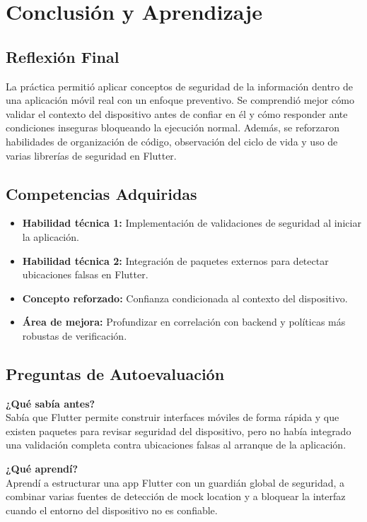 \documentclass[12pt, a4paper]{article}
\begin{document}
\section{Conclusión y Aprendizaje}

\subsection*{Reflexión Final}
La práctica permitió aplicar conceptos de seguridad de la información dentro de una aplicación móvil real con un enfoque preventivo. Se comprendió mejor cómo validar el contexto del dispositivo antes de confiar en él y cómo responder ante condiciones inseguras bloqueando la ejecución normal. Además, se reforzaron habilidades de organización de código, observación del ciclo de vida y uso de varias librerías de seguridad en Flutter.

\subsection*{Competencias Adquiridas}
\begin{itemize}[topsep=4pt]
    \item \textbf{Habilidad técnica 1:} Implementación de validaciones de seguridad al iniciar la aplicación.
    \item \textbf{Habilidad técnica 2:} Integración de paquetes externos para detectar ubicaciones falsas en Flutter.
    \item \textbf{Concepto reforzado:} Confianza condicionada al contexto del dispositivo.
    \item \textbf{Área de mejora:} Profundizar en correlación con backend y políticas más robustas de verificación.
\end{itemize}

\subsection*{Preguntas de Autoevaluación}

\textbf{¿Qué sabía antes?}\\[4pt]
Sabía que Flutter permite construir interfaces móviles de forma rápida y que existen paquetes para revisar seguridad del dispositivo, pero no había integrado una validación completa contra ubicaciones falsas al arranque de la aplicación.

\vspace{6pt}
\textbf{¿Qué aprendí?}\\[4pt]
Aprendí a estructurar una app Flutter con un guardián global de seguridad, a combinar varias fuentes de detección de mock location y a bloquear la interfaz cuando el entorno del dispositivo no es confiable.
\end{document}
